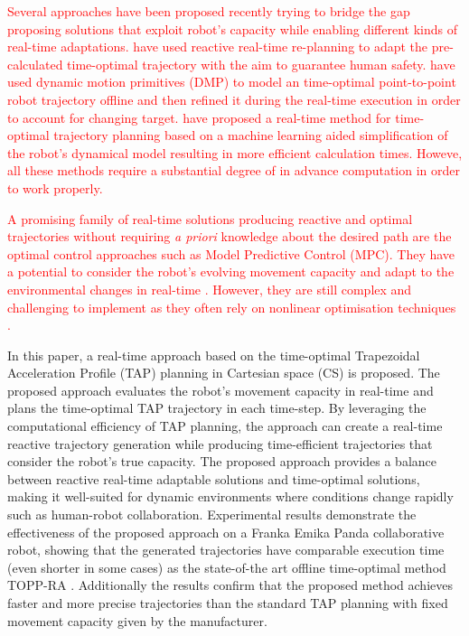 \textcolor{red}{
Several approaches have been proposed recently trying to bridge the gap proposing solutions that exploit robot's capacity while enabling different kinds of real-time adaptations. \citet{Palleschi2021} have used reactive real-time re-planning to adapt the pre-calculated time-optimal trajectory with the aim to guarantee human safety. \citet{dmp2014} have used dynamic motion primitives (DMP) to model an time-optimal point-to-point robot trajectory offline and then refined it during the real-time execution in order to account for changing target. \citet{ZHANG2020} have proposed a real-time method for time-optimal trajectory planning based on a machine learning aided simplification of the robot's dynamical model resulting in more efficient calculation times. Howeve, all these methods require a substantial degree of in advance computation in order to work properly.
}

\textcolor{red}{
A promising family of real-time solutions producing reactive and optimal trajectories without requiring \textit{a priori} knowledge about the desired path are the optimal control approaches such as Model Predictive Control (MPC). They have a potential to consider the robot's evolving movement capacity and adapt to the environmental changes in real-time \cite{torresalberto2022}\cite{Eckhoff2022}. However, they are still complex and challenging to implement as they often rely on nonlinear optimisation techniques \cite{kelff2021,Massaro2023}.}


In this paper, a real-time approach based on the time-optimal Trapezoidal Acceleration Profile (TAP) \cite{modernrobotics} planning in Cartesian space (CS) is proposed. The proposed approach evaluates the robot's movement capacity in real-time and plans the time-optimal TAP trajectory in each time-step. By leveraging the computational efficiency of TAP planning, the approach can create a real-time reactive trajectory generation while producing time-efficient trajectories that consider the robot's true capacity. The proposed approach provides a balance between reactive real-time adaptable solutions and time-optimal solutions, making it well-suited for dynamic environments where conditions change rapidly such as human-robot collaboration. 
Experimental results demonstrate the effectiveness of the proposed approach on a Franka Emika Panda collaborative robot, showing that the generated trajectories have comparable execution time (even shorter in some cases) as the state-of-the art offline time-optimal method TOPP-RA \cite{Pham2018}. Additionally the results confirm that the proposed method achieves faster and more precise trajectories than the standard TAP planning with fixed movement capacity given by the manufacturer. 

